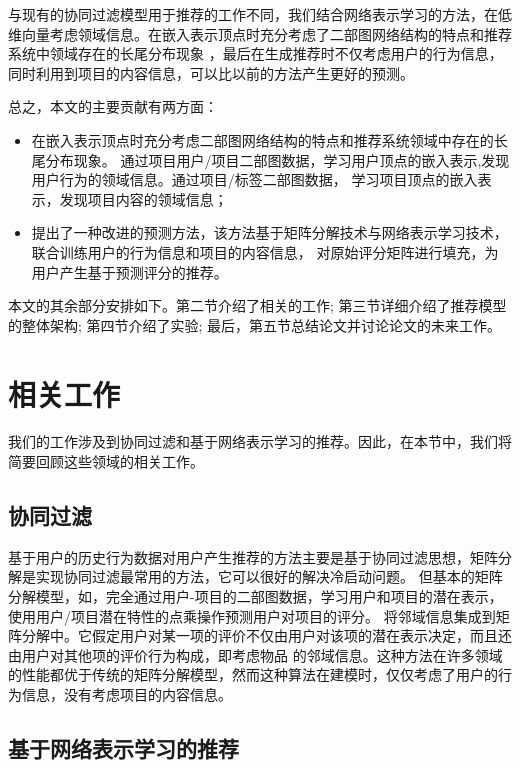 \documentclass[lang=cn,11pt]{elegantpaper}
\begin{document}
与现有的协同过滤模型用于推荐的工作不同，我们结合网络表示学习的方法，在低维向量考虑领域信息。在嵌入表示顶点时充分考虑了二部图网络结构的特点和推荐系统中领域存在的长尾分布现象
，最后在生成推荐时不仅考虑用户的行为信息，同时利用到项目的内容信息，可以比以前的方法产生更好的预测。

总之，本文的主要贡献有两方面：
\begin{itemize}
    \item 在嵌入表示顶点时充分考虑二部图网络结构的特点和推荐系统领域中存在的长尾分布现象。
    通过项目用户/项目二部图数据，学习用户顶点的嵌入表示,发现用户行为的领域信息。通过项目/标签二部图数据，
    学习项目顶点的嵌入表示，发现项目内容的领域信息；
	
    \item 提出了一种改进的预测方法，该方法基于矩阵分解技术与网络表示学习技术，联合训练用户的行为信息和项目的内容信息，
    对原始评分矩阵进行填充，为用户产生基于预测评分的推荐。
\end{itemize}

本文的其余部分安排如下。第二节介绍了相关的工作; 第三节详细介绍了推荐模型的整体架构; 第四节介绍了实验; 最后，第五节总结论文并讨论论文的未来工作。


\section{相关工作}

我们的工作涉及到协同过滤和基于网络表示学习的推荐。因此，在本节中，我们将简要回顾这些领域的相关工作。

\subsection{协同过滤}

基于用户的历史行为数据对用户产生推荐的方法主要是基于协同过滤思想\cite{Su2009}，矩阵分解是实现协同过滤最常用的方法，它可以很好的解决冷启动问题\cite{Qiu2011}。
但基本的矩阵分解模型，如\cite{Salakhutdinov2007,Koren2009}，完全通过用户-项目的二部图数据，学习用户和项目的潜在表示，使用用户/项目潜在特性的点乘操作预测用户对项目的评分。
\cite{Koren2008}将邻域信息集成到矩阵分解中。它假定用户对某一项的评价不仅由用户对该项的潜在表示决定，而且还由用户对其他项的评价行为构成，即考虑物品
的邻域信息。这种方法在许多领域的性能都优于传统的矩阵分解模型，然而这种算法在建模时，仅仅考虑了用户的行为信息，没有考虑项目的内容信息。

\subsection{基于网络表示学习的推荐}
\end{document}
